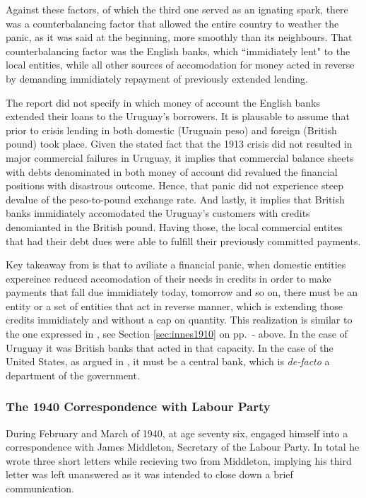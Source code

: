 Against these factors, of which the third one served as an ignating spark, \citeauthor{innes1914a} there was a counterbalancing factor that allowed the entire country to weather the panic, as it was said at the beginning, more smoothly than its neighbours. That counterbalancing factor was the English banks, which ``immidiately lent" to the local entities, while all other sources of accomodation for money acted in reverse by demanding immidiately repayment of previously extended lending. 

The report did not specify in which money of account the English banks extended their loans to the Uruguay's borrowers. It is plausable to assume that prior to crisis lending in both domestic (Uruguain peso) and foreign (British pound) took place. Given the stated fact that the 1913 crisis did not resulted in major commercial failures in Uruguay, it implies that commercial balance sheets with debts denominated in both money of account did revalued the financial positions with disastrous outcome. Hence, that panic did not experience steep devalue of the peso-to-pound exchange rate. And lastly, it implies that British banks immidiately accomodated the Uruguay's customers with credits denomianted in the British pound. Having those, the local commercial entites that had their debt dues were able to fulfill their previously committed payments.

Key takeaway from \cite{innes1914a} is that to aviliate a financial panic, when domestic entities expereince reduced accomodation of their needs in credits in order to make payments that fall due immidiately today, tomorrow and so on, there must be an entity or a set of entities that act in reverse manner, which is extending those credits immidiately and without a cap on quantity. This realization is similar to the one expressed in \cite{innes1910}, see Section \ref{sec:innes1910} on pp.~\pageref{sec:innes1910}-\pageref{sec:twokeyarticles} above. In the case of Uruguay it was British banks that acted in that capacity. In the case of the United States, as argued in \cite{innes1910}, it must be a central bank, which is \textit{de-facto} a department of the government.

\subsubsection{The 1940 Correspondence with Labour Party}

During February and March of 1940, at age seventy six, \citeauthor{innes1940} engaged himself into a correspondence with James Middleton, Secretary of the Labour Party. In total he wrote three short letters while recieving two from Middleton, implying his third letter was left unanswered as it was intended to close down a brief communication. 


